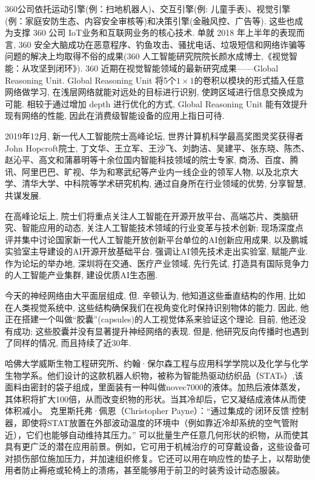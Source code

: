 360公司依托运动引擎(例：扫地机器人)、交互引擎(例: 儿童手表)、视觉引擎(例：家庭安防生态、内容安全审核等)和决策引擎(金融风控、广告等). 这些也成为支撑 360 公司 IoT业务和互联网业务的核心技术. 单就 2018 年上半年的表现而言, 360 安全大脑成功在恶意程序、钓鱼攻击、骚扰电话、垃圾短信和网络诈骗等问题的解决上均取得不俗的成果(360 人工智能研究院院长颜水成博士,《视觉智能：从攻坚到闭环》).
360 近期在视觉智能领域的最新研究成果——Global Reasoning Unit. Global Reasoning Unit 将5个$1\times1$的卷积以模块的形式插入任意网络做学习, 在浅层网络就能对远处的目标进行识别, 使跨区域进行信息交换成为可能. 相较于通过增加 depth 进行优化的方式, Global Reasoning Unit 能有效提升现有网络的性能, 因此在消费级智能设备的应用上指日可待.

2019年12月, 新一代人工智能院士高峰论坛, 世界计算机科学最高奖图灵奖获得者John Hopcroft院士, 丁文华、王立军、王沙飞、刘韵洁、吴建平、张东晓、陈杰、赵沁平、高文和蒲慕明等十余位国内智能科技领域的院士专家, 商汤、百度、腾讯、阿里巴巴、旷视、华为和寒武纪等产业内一线企业的领军人物, 以及北京大学、清华大学、中科院等学术研究机构, 通过自身所在行业领域的优势, 分享智慧, 共谋发展.

在高峰论坛上, 院士们将重点关注人工智能在开源开放平台、高端芯片、类脑研究、智能应用的动态, 关注人工智能技术领域的行业变革与技术创新; 现场深度点评并集中讨论国家新一代人工智能开放创新平台单位的AI创新应用成果, 以及鹏城实验室主导建设的AI开源开放基础平台.
强调让AI领先技术走出实验室, 赋能产业. 作为论坛的举办地, 深圳将在交通、医疗产业领域, 先行先试, 打造具有国际竞争力的人工智能产业集群, 建设优质AI生态圈.

今天的神经网络由大平面层组成, 但. 辛顿认为, 他知道这些垂直结构的作用, 比如在人类视觉系统中, 这些结构确保我们在视角变化时保持识别物体的能力. 因此, 他正在搭建一个叫做“胶囊”(capsules)的人工视觉体系来验证这个理论. 目前, 他还没有成功; 这些胶囊并没有显著提升神经网络的表现. 但是, 他研究反向传播时也遇到了同样的情况, 而且持续了近30年.

哈佛大学威斯生物工程研究所、约翰·保尔森工程与应用科学学院以及化学与化学生物学系。他们设计的这款机器人织物，被称为智能热驱动纺织品（STATs）,该面料由密封的袋子组成，里面装有一种叫做novec7000的液体。加热后液体蒸发，其体积将扩大100倍，从而改变织物的形状。当其冷却后，它又凝结成液体从而使体积减小。
克里斯托弗·佩恩（Christopher Payne）：“通过集成的‘闭环反馈’控制器，即使将STAT放置在外部波动温度的环境中（例如靠近冷却系统的空气管附近），它们也能够自动维持其压力。”
可以批量生产任意几何形状的织物，从而使其具有更广泛的潜在应用前景。例如，它可用于机械治疗的可穿戴设备，这些设备可对损伤部位施加压力，并加速组织修复。它还可以用在响应性的垫子上，以帮助使用者防止褥疮或轮椅上的溃疡，甚至能够用于前卫的时装秀设计动态服装。
